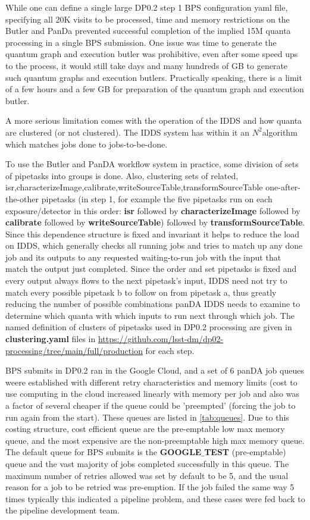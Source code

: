 \documentclass[OPS,authoryear,toc]{lsstdoc}
\begin{document}
While one can define a single large DP0.2 step 1 BPS configuration yaml file,
specifying all 20K visits to be processed, time and memory restrictions
on the Butler and PanDa prevented successful completion of the implied 
15M quanta processing in a single BPS submission.
One issue was time to generate the quantum graph and execution butler was
prohibitive, even after some speed ups to the process, it would still take
days and many hundreds of GB to generate such quantum graphs and execution
butlers.  Practically speaking, there is a limit of a few hours and a few GB
for preparation of the quantum graph and execution butler.  

A more serious limitation comes with the operation of the IDDS and how
quanta are clustered (or not clustered).  The IDDS system has within it an $N^2$algorithm which matches jobs done to jobs-to-be-done.

To use the Butler and PanDA workflow system in practice, some division of
sets of pipetasks into groups is done.  Also, clustering sets of related, 
isr,characterizeImage,calibrate,writeSourceTable,transformSourceTable
one-after-the-other pipetasks (in step 1, for example the five pipetasks run on
each exposure/detector in this order: {\bf isr} followed by 
{\bf characterizeImage} followed by {\bf calibrate} followed by 
{\bf writeSourceTable}) followed by  {\bf transformSourceTable}.  Since this
dependence structure is fixed and invariant it helps to reduce the load 
on IDDS, which generally checks all running jobs and tries to match up
any done job and its outputs to any requested waiting-to-run job with the input that match the output just completed. Since the 
order and set pipetasks is fixed and every output always flows to the
next pipetask's input, IDDS need not try to match every possible pipetask b 
to follow on from pipetask a, thus greatly reducing the number of possible
combinations panDA IDDS needs to examine to determine which quanta with which
inputs to run next through which job.  The named definition of clusters 
of pipetasks used in DP0.2 processing are 
given in {\bf clustering.yaml} files in 
\url{https://github.com/lsst-dm/dp02-processing/tree/main/full/production} 
for each step.  

BPS submits in DP0.2 ran in the Google Cloud, and a set of 6 panDA job queues weere established with different retry characteristics and memory limits (cost
to use computing in the cloud increased linearly with memory per job and also
was a factor of several cheaper if the queue could be 'preempted' (forcing
the job to run again from the start).  These queues are listed in \ref{tab:queues}. Due to this costing structure, cost efficient queue are 
the pre-emptable low max memory queue, and the most expensive are the 
non-preemptable high max memory queue. The default queue for BPS submits 
is the {\bf GOOGLE$\_$TEST} (pre-emptable) queue and the vast majority 
of jobs completed successfully in this queue.  The maximum number of
retries allowed was set by default to be 5, and the usual reason for a 
job to be retried was pre-emption.  If the job failed the same way 5 times
typically this indicated a pipeline problem, and these cases were
fed back to the pipeline development team.
\end{document}
